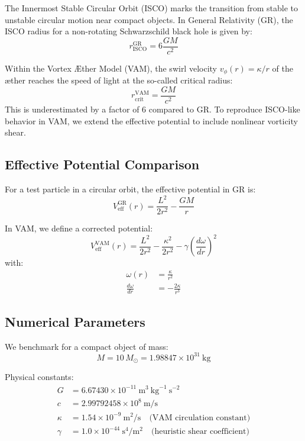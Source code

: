 \documentclass[a4paper, aps,preprint,superscriptaddress, 12pt]{revtex4}
\begin{document}
The Innermost Stable Circular Orbit (ISCO) marks the transition from stable to unstable circular motion near compact objects. In General Relativity (GR), the ISCO radius for a non-rotating Schwarzschild black hole is given by:
\begin{equation}
    r_{\text{ISCO}}^{\text{GR}} = 6\frac{GM}{c^2}
\end{equation}

Within the Vortex Æther Model (VAM), the swirl velocity \( v_\phi(r) = \kappa/r \) of the æther reaches the speed of light at the so-called critical radius:
\begin{equation}
    r_{\text{crit}}^{\text{VAM}} = \frac{GM}{c^2}
\end{equation}
This is underestimated by a factor of 6 compared to GR. To reproduce ISCO-like behavior in VAM, we extend the effective potential to include nonlinear vorticity shear.

\subsection{Effective Potential Comparison}

For a test particle in a circular orbit, the effective potential in GR is:
\begin{equation}
    V_{\text{eff}}^{\text{GR}}(r) = \frac{L^2}{2r^2} - \frac{GM}{r}
\end{equation}

In VAM, we define a corrected potential:
\begin{equation}
    V_{\text{eff}}^{\text{VAM}}(r) = \frac{L^2}{2r^2} - \frac{\kappa^2}{2r^2} - \gamma \left(\frac{d\omega}{dr}\right)^2
\end{equation}
with:
\begin{align}
    \omega(r) &= \frac{\kappa}{r^2} \\
    \frac{d\omega}{dr} &= -\frac{2\kappa}{r^3}
\end{align}

\subsection{Numerical Parameters}

We benchmark for a compact object of mass:
\begin{equation}
    M = 10\,M_\odot = 1.98847 \times 10^{31}~\text{kg}
\end{equation}

Physical constants:
\begin{align*}
    G &= 6.67430 \times 10^{-11}~\text{m}^3~\text{kg}^{-1}~\text{s}^{-2} \\
    c &= 2.99792458 \times 10^8~\text{m/s} \\
    \kappa &= 1.54 \times 10^{-9}~\text{m}^2/\text{s} \quad \text{(VAM circulation constant)} \\
    \gamma &= 1.0 \times 10^{-44}~\text{s}^4/\text{m}^2 \quad \text{(heuristic shear coefficient)}
\end{align*}
\end{document}
